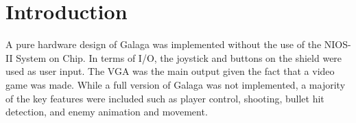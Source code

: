 \section{Introduction}
\quad
A pure hardware design of Galaga was implemented without the use of the NIOS-II System on Chip.
In terms of I/O, the joystick and buttons on the shield were used as user input.
The VGA was the main output given the fact that a video game was made.
While a full version of Galaga was not implemented, a majority of the key features were included such as player control, shooting, bullet hit detection, and enemy animation and movement.
